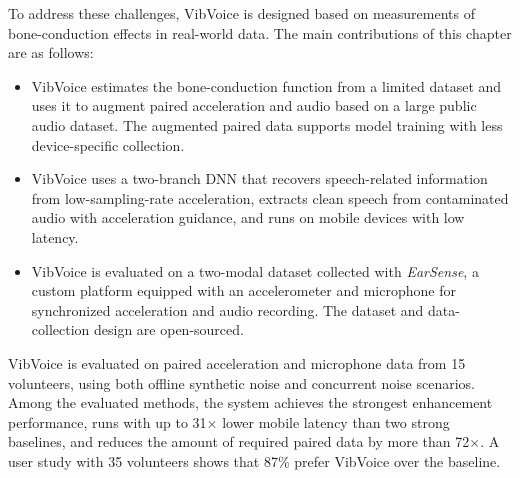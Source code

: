 To address these challenges, VibVoice is designed based on measurements of bone-conduction effects in real-world data. The main contributions of this chapter are as follows:
\begin{itemize}
    \item VibVoice estimates the bone-conduction function from a limited dataset and uses it to augment paired acceleration and audio based on a large public audio dataset. The augmented paired data supports model training with less device-specific collection.
    \item VibVoice uses a two-branch DNN that recovers speech-related information from low-sampling-rate acceleration, extracts clean speech from contaminated audio with acceleration guidance, and runs on mobile devices with low latency.
    \item VibVoice is evaluated on a two-modal dataset collected with \emph{EarSense}, a custom platform equipped with an accelerometer and microphone for synchronized acceleration and audio recording. The dataset and data-collection design are open-sourced.
\end{itemize}

VibVoice is evaluated on paired acceleration and microphone data from 15 volunteers, using both offline synthetic noise and concurrent noise scenarios.
Among the evaluated methods, the system achieves the strongest enhancement performance, runs with up to 31$\times$ lower mobile latency than two strong baselines, and reduces the amount of required paired data by more than 72$\times$.
A user study with 35 volunteers shows that 87\% prefer VibVoice over the baseline.





